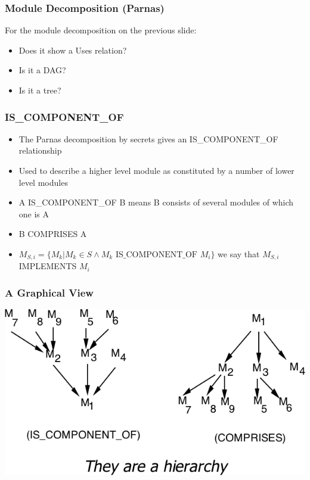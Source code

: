 \documentclass[t,12pt,numbers,fleqn]{beamer}
\begin{document}

\begin{frame}
\frametitle{Module Decomposition (Parnas)}

For the module decomposition on the previous slide:

\begin{itemize}
\item Does it show a Uses relation?  
\item Is it a DAG?  
\item Is it a tree?
\end{itemize}

\end{frame}


\begin{frame}
\frametitle{IS\_COMPONENT\_OF}

\begin{itemize}
\item The Parnas decomposition by secrets gives an IS\_COMPONENT\_OF relationship
\item Used to describe a higher level module as constituted by a number of lower level modules
\item A IS\_COMPONENT\_OF B means B consists of several modules of which one is A
\item B COMPRISES A
\item $M_{S,i} = \{ M_k | M_k \in S \wedge M_k \mbox{ IS\_COMPONENT\_OF } M_i \}$ we say that $M_{S,i}$ IMPLEMENTS
$M_i$ 
\end{itemize}

\end{frame}


\begin{frame}
\frametitle{A Graphical View}

\begin{center}
\includegraphics[width=1.0\textwidth]{../Figures/GraphViewOf_IS_COMPONENT_OF.png}
\end{center}

\end{frame}
\end{document}
